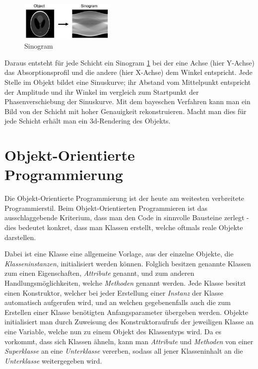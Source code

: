 \documentclass[]{dsadokumentation}
\begin{document}
\begin{figure}
  \includegraphics[width=0.4\textwidth]{k4.2/backprojektion.png}
  \caption{Sinogram}
  \label{k4.2.tomo.ct.bp}
\end{figure}



Daraus entsteht für jede Schicht ein Sinogram \cref{k4.2.tomo.ct.bp} bei der eine Achse (hier Y-Achse) das Absorptionsprofil und die andere (hier X-Achse) dem Winkel entspricht. Jede Stelle im Objekt bildet eine Sinuskurve; ihr Abstand vom Mittelpunkt entspricht der Amplitude und ihr Winkel im vergleich zum Startpunkt der Phasenverschiebung der Sinuskurve. Mit dem bayeschen Verfahren  kann man ein Bild von der Schicht mit hoher Genauigkeit rekonstruieren. Macht man dies für jede Schicht erhält man ein 3d-Rendering des Objekts.

\section{Objekt-Orientierte Programmierung}
Die Objekt-Orientierte Programmierung ist der heute am weitesten verbreitete Programmierstil. Beim Objekt-Orientierten Programmieren ist das ausschlaggebende Kriterium, dass man den Code in sinnvolle Bausteine zerlegt - dies bedeutet konkret, dass man Klassen erstellt, welche oftmals reale Objekte darstellen.

Dabei ist eine Klasse eine allgemeine Vorlage, aus der einzelne Objekte, die \emph{Klasseninstanzen}, initialisiert werden können. Folglich besitzen genannte Klassen zum einen Eigenschaften, \emph{Attribute} genannt, und zum anderen Handlungsmöglichkeiten, welche \emph{Methoden} genannt werden. Jede Klasse besitzt einen Konstruktor, welcher bei jeder Erstellung einer \emph{Instanz} der Klasse automatisch aufgerufen wird, und an welchen gegebenenfalls auch die zum Erstellen einer Klasse benötigten Anfangsparameter übergeben werden. Objekte initialisiert man durch Zuweisung des Konstruktoraufrufs der jeweiligen Klasse an eine Variable, welche nun zu einem Objekt des Klassentyps wird. Da es vorkommt, dass sich Klassen ähneln, kann man \emph{Attribute} und \emph{Methoden} von einer \emph{Superklasse} an eine \emph{Unterklasse} vererben, sodass all jener Klasseninhalt an die \emph{Unterklasse} weitergegeben wird.
\end{document}
